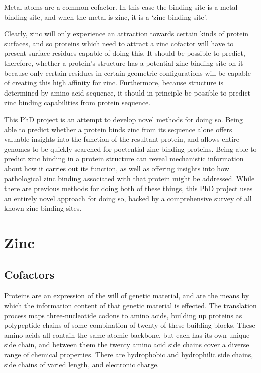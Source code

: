 Metal atoms are a common cofactor. In this case the binding site is a metal binding site, and when the metal is zinc, it is a `zinc binding site'.

Clearly, zinc will only experience an attraction towards certain kinds of protein surfaces, and so proteins which need to attract a zinc cofactor will have to present surface residues capable of doing this. It should be possible to predict, therefore, whether a protein's structure has a potential zinc binding site on it because only certain residues in certain geometric configurations will be capable of creating this high affinity for zinc. Furthermore, because structure is determined by amino acid sequence, it should in principle be possible to predict zinc binding capabilities from protein sequence.

This PhD project is an attempt to develop novel methods for doing so. Being able to predict whether a protein binds zinc from its sequence alone offers valuable insights into the function of the resultant protein, and allows entire genomes to be quickly searched for poetential zinc binding proteins. Being able to predict zinc binding in a protein structure can reveal mechanistic information about how it carries out its function, as well as offering insights into how pathological zinc binding associated with that protein might be addressed. While there are previous methods for doing both of these things, this PhD project uses an entirely novel approach for doing so, backed by a comprehensive survey of all known zinc binding sites.

\section{Zinc}

\subsection{Cofactors}

Proteins are an expression of the will of genetic material, and are the means by which the information content of that genetic material is effected. The translation process maps three-nucleotide codons to amino acids, building up proteins as polypeptide chains of some combination of twenty of these building blocks. These amino acids all contain the same atomic backbone, but each has its own unique side chain, and between them the twenty amino acid side chains cover a diverse range of chemical properties. There are hydrophobic and hydrophilic side chains, side chains of varied length, and electronic charge.

